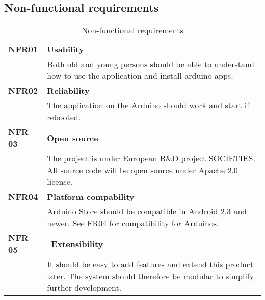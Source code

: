 \subsection{Non-functional requirements}
\begin{table}[H]
\begin{tabular}{ll}
\textbf{NFR01} & \textbf{Usability}\\
 & Both old and young persons should be able to understand how to use the application and install arduino-apps.\\
\textbf{NFR02} & \textbf{Reliability}\\
 & The application on the Arduino should work and start if rebooted.\\
\textbf{NFR 03} & \textbf{Open source}\\
 & The project is under European R\&D project SOCIETIES. All source code will be open source under Apache 2.0 license.\\
\textbf{NFR04} & \textbf{Platform compability}\\
 & Arduino Store should be compatible in Android 2.3 and newer. See FR04 for compatibility for Arduinos.\\
\textbf{NFR 05} & \textbf{Extensibility}\\
 & It should be easy to add features and extend this product later. The system should therefore be modular to simplify further development.\\
\end{tabular}
\caption{Non-functional requirements}
\end{table}